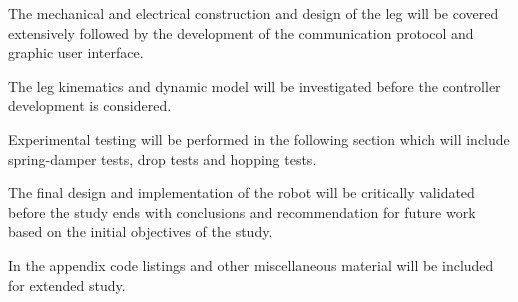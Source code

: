 The mechanical and electrical construction and design of the leg will be covered extensively followed by the development of the communication protocol and graphic user interface. 

The leg kinematics and dynamic model will be investigated before the controller development is considered.

Experimental testing will be performed in the following section which will include spring-damper tests, drop tests and hopping tests.

The final design and implementation of the robot will be critically validated before the study ends with conclusions  and recommendation for future work based on the initial objectives of the study.

In the appendix code listings and other miscellaneous material will be included for extended study.
